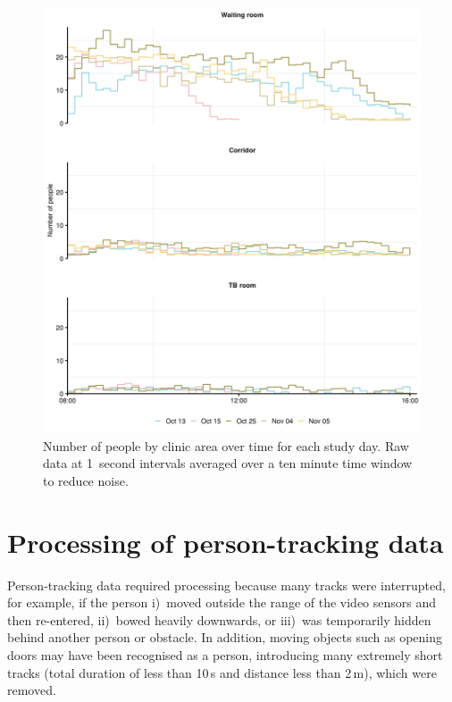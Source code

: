 \documentclass[fleqn,11pt]{wlscirep_supp}
\begin{document}
\begin{figure}[!htpb]
    \centering
    \includegraphics{results/data/no-people-over-time-by-day.png}
    \caption{Number of people by clinic area over time for each study day. Raw data at 1~second intervals  averaged over a ten minute time window to reduce noise.}
    \label{fig:people-over-time-by-day}
\end{figure}

\clearpage

\section{Processing of person-tracking data}\label{sec:setting-and-data}

Person-tracking data required processing because many tracks were interrupted, for example, if the person i)~moved outside the range of the video sensors and then re-entered, ii)~bowed heavily downwards, or iii)~was temporarily hidden behind another person or obstacle. In addition, moving objects such as opening doors may have been recognised as a person, introducing many extremely short tracks (total duration of less than 10\,s and distance less than 2\,m), which were removed.
\end{document}
